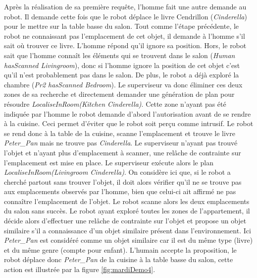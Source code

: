 \documentclass[a4paper,11pt,twoside]{StyleThese}
\begin{document}
Après la réalisation de sa première requête, l'homme fait une autre demande au robot. Il demande cette fois que le robot déplace le livre Cendrillon (\textit{Cinderella}) pour le mettre sur la table basse du salon.
Tout comme l'étape précédente, le robot ne connaissant pas l'emplacement de cet objet, il demande à l'homme s'il sait où trouver ce livre.
L'homme répond qu'il ignore sa position.
Hors, le robot sait que l'homme connaît les éléments qui se trouvent dans le salon (\textit{Human hasScanned  Livingroom}), donc si l'homme ignore la position de cet objet c'est qu'il n'est probablement pas dans le salon. De plus, le robot a déjà exploré la chambre (\textit{Pr2 hasScanned Bedroom}). Le superviseur va donc éliminer ces deux zones de sa recherche et directement demander une génération de plan pour résoudre \textit{LocaliseInRoom(Kitchen Cinderella)}. Cette zone n'ayant pas été indiquée par l'homme le robot demande d'abord l'autorisation avant de se rendre à la cuisine. Ceci permet d'éviter que le robot soit perçu comme intrusif.
Le robot se rend donc à la table de la cuisine, scanne l'emplacement et trouve le livre \textit{Peter\_Pan} mais ne trouve pas \textit{Cinderella}.
Le superviseur n'ayant pas trouvé l'objet et n'ayant plus d'emplacement à scanner, une relâche de contrainte sur l'emplacement est mise en place.
Le superviseur exécute alors le plan \textit{LocaliseInRoom(Livingroom Cinderella)}. On considère ici que, si le robot a cherché partout sans trouver l'objet, il doit alors vérifier qu'il ne se trouve pas aux emplacements observés par l'homme, bien que celui-ci ait affirmé ne pas connaître l'emplacement de l'objet.
Le robot scanne alors les deux emplacements du salon sans succès.
Le robot ayant exploré toutes les zones de l'appartement, il décide alors d'effectuer une relâche de contrainte sur l'objet et propose un objet similaire s'il a connaissance d'un objet similaire présent dans l'environnement.
Ici \textit{Peter\_Pan} est considéré comme un objet similaire car il est du même type (livre) et du même genre (compte pour enfant).
L'humain accepte la proposition, le robot déplace donc \textit{Peter\_Pan} de la cuisine à la table basse du salon, cette action est illustrée par la figure \ref{fig:mardiDemo4}.
\end{document}
